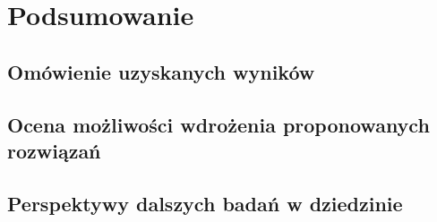 \chapter{Podsumowanie}
\section{Omówienie uzyskanych wyników}
\section{Ocena możliwości wdrożenia proponowanych rozwiązań}
\section{Perspektywy dalszych badań w dziedzinie}


\listoffigures

\listoftables


